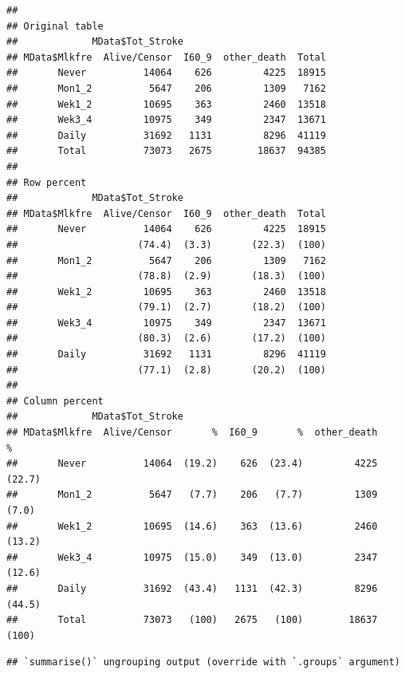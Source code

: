 \documentclass[
]{article}
\newenvironment{Shaded}{\begin{snugshade}}{\end{snugshade}}
\newcommand{\DataTypeTok}[1]{\textcolor[rgb]{0.13,0.29,0.53}{#1}}
\newcommand{\KeywordTok}[1]{\textcolor[rgb]{0.13,0.29,0.53}{\textbf{#1}}}
\newcommand{\NormalTok}[1]{#1}
\newcommand{\OperatorTok}[1]{\textcolor[rgb]{0.81,0.36,0.00}{\textbf{#1}}}
\newcommand{\StringTok}[1]{\textcolor[rgb]{0.31,0.60,0.02}{#1}}
\begin{document}
\begin{verbatim}
## 
## Original table 
##             MData$Tot_Stroke
## MData$Mlkfre  Alive/Censor  I60_9  other_death  Total
##       Never          14064    626         4225  18915
##       Mon1_2          5647    206         1309   7162
##       Wek1_2         10695    363         2460  13518
##       Wek3_4         10975    349         2347  13671
##       Daily          31692   1131         8296  41119
##       Total          73073   2675        18637  94385
## 
## Row percent 
##             MData$Tot_Stroke
## MData$Mlkfre  Alive/Censor  I60_9  other_death  Total
##       Never          14064    626         4225  18915
##                     (74.4)  (3.3)       (22.3)  (100)
##       Mon1_2          5647    206         1309   7162
##                     (78.8)  (2.9)       (18.3)  (100)
##       Wek1_2         10695    363         2460  13518
##                     (79.1)  (2.7)       (18.2)  (100)
##       Wek3_4         10975    349         2347  13671
##                     (80.3)  (2.6)       (17.2)  (100)
##       Daily          31692   1131         8296  41119
##                     (77.1)  (2.8)       (20.2)  (100)
## 
## Column percent 
##             MData$Tot_Stroke
## MData$Mlkfre  Alive/Censor       %  I60_9       %  other_death       %
##       Never          14064  (19.2)    626  (23.4)         4225  (22.7)
##       Mon1_2          5647   (7.7)    206   (7.7)         1309   (7.0)
##       Wek1_2         10695  (14.6)    363  (13.6)         2460  (13.2)
##       Wek3_4         10975  (15.0)    349  (13.0)         2347  (12.6)
##       Daily          31692  (43.4)   1131  (42.3)         8296  (44.5)
##       Total          73073   (100)   2675   (100)        18637   (100)
\end{verbatim}

\begin{Shaded}
\end{Shaded}

\begin{verbatim}
## `summarise()` ungrouping output (override with `.groups` argument)
\end{verbatim}
\end{document}
